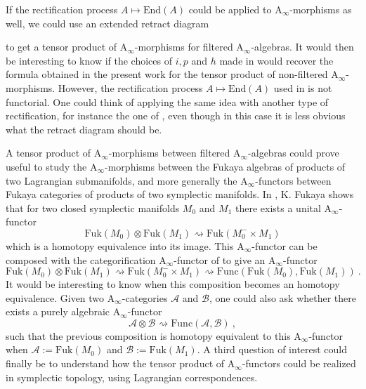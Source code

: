 \documentclass[twoside, 12pt]{amsart}
\theoremstyle{remark}
\newcommand{\Ainf}{\mathrm{A}_\infty} %
\begin{document}
If the rectification process $A \mapsto \mathrm{End}(A)$ could be applied to $\Ainf$-morphisms as well, we could use an extended retract diagram
\begin{center} 
\end{center}
to get a tensor product of $\Ainf$-morphisms for filtered $\Ainf$-algebras.
It would then be interesting to know if the choices of $i,p$ and $h$ made in \cite{amorim-tensor} would recover the formula obtained in the present work for the tensor product of non-filtered $\Ainf$-morphisms. 
However, the rectification process $A \mapsto \mathrm{End}(A)$ used in \cite{amorim-tensor} is not functorial. 
One could think of applying the same idea with another type of rectification, for instance the one of \cite[Theorem 11.4.4]{LodayVallette12}, even though in this case it is less obvious what the retract diagram should be. 

A tensor product of $\Ainf$-morphisms between filtered $\Ainf$-algebras could prove useful to study the $\Ainf$-morphisms between the Fukaya algebras of products of two Lagrangian submanifolds, and more generally the $\Ainf$-functors between Fukaya categories of products of two symplectic manifolds.
In \cite{fukaya-unobstructed}, K. Fukaya shows that for two closed symplectic manifolds $M_0$ and $M_1$ there exists a unital $\Ainf$-functor
\[ \mathrm{Fuk}(M_0) \otimes \mathrm{Fuk}(M_1) \rightsquigarrow \mathrm{Fuk}(M_0^- \times M_1) \]
which is a homotopy equivalence into its image. 
This $\Ainf$-functor can be composed with the categorification $\Ainf$-functor of \cite[Theorem 1.1]{mau-wehrheim-woodward} to give an $\Ainf$-functor
\[ \mathrm{Fuk}(M_0) \otimes \mathrm{Fuk}(M_1) \rightsquigarrow \mathrm{Fuk}(M_0^- \times M_1) \rightsquigarrow \mathrm{Func} ( \mathrm{Fuk}(M_0) , \mathrm{Fuk}(M_1) ) \ .  \]
It would  be interesting to know when this composition becomes an homotopy equivalence. 
Given two $\Ainf$-categories $\mathcal{A}$ and $\mathcal{B}$, one could also ask whether there exists a purely algebraic $\Ainf$-functor 
\[ \mathcal{A} \otimes \mathcal{B} \rightsquigarrow \mathrm{Func} ( \mathcal{A} , \mathcal{B} ) \ , \]
such that the previous composition is homotopy equivalent to this $\Ainf$-functor when $\mathcal{A} := \mathrm{Fuk}(M_0)$ and $\mathcal{B} := \mathrm{Fuk}(M_1)$.
A third question of interest could finally be to understand how the tensor product of $\Ainf$-functors could be realized in symplectic topology, using Lagrangian correspondences.
\end{document}
